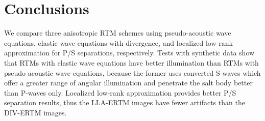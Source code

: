 \documentclass[manuscript,ulem,graphix,revised]{geophysics}
\begin{document}
\section{Conclusions}
\indent\indent
We compare three anisotropic RTM schemes using pseudo-acoustic wave equations, elastic wave equations with divergence, and localized low-rank approximation for P/S separations, respectively. Tests with synthetic data show that RTMs with elastic wave equations have better illumination than RTMs with pseudo-acoustic wave equations, because the former uses converted S-waves which offer a greater range of angular illumination and penetrate the salt body better than P-waves only. Localized low-rank approximation provides better P/S separation results, thus the LLA-ERTM images have fewer artifacts than the DIV-ERTM images. 





%


%

\newpage


\end{document}
